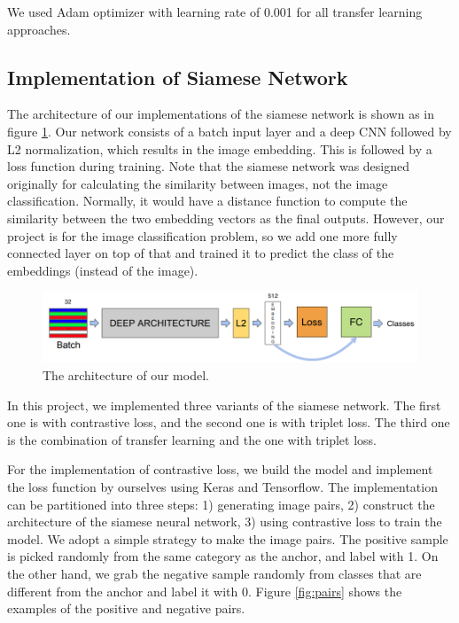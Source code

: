We used Adam optimizer with learning rate of 0.001 for all transfer learning approaches.

\subsection{Implementation of Siamese Network}

The architecture of our implementations of the siamese network is shown as in figure \ref{fig:model}. Our network consists of a batch input layer and a deep CNN followed by L2 normalization, which results in the image embedding. This is followed by a loss function during training. Note that the siamese network was designed originally for calculating the similarity between images, not the image classification. Normally, it would have a distance function to compute the similarity between the two embedding vectors as the final outputs. However, our project is for the image classification problem, so we add one more fully connected layer on top of that and trained it to predict the class of the embeddings (instead of the image). 

\begin{figure}[h]
  \centering
  \includegraphics[width=\linewidth]{figs/model.png}
  \caption{The architecture of our model.}
  \label{fig:model}
\end{figure}

In this project, we implemented three variants of the siamese network. The first one is with contrastive loss, and the second one is with triplet loss. The third one is the combination of transfer learning and the one with triplet loss.

For the implementation of contrastive loss, we build the model and implement the loss function by ourselves using Keras and Tensorflow. The implementation can be partitioned into three steps: 1) generating image pairs, 2) construct the architecture of the siamese neural network, 3) using contrastive loss to train the model. We adopt a simple strategy to make the image pairs. The positive sample is picked randomly from the same category as the anchor, and label with 1. On the other hand, we grab the negative sample randomly from classes that are different from the anchor and label it with 0. Figure \ref{fig:pairs} shows the examples of the positive and negative pairs. 

